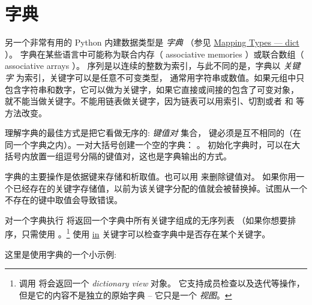 \documentclass[a4paper,10pt,english]{sphinxmanual}
\begin{document}
\section{字典}
\label{datastructures:tut-dictionaries}\label{datastructures:id10}
另一个非常有用的 Python 内建数据类型是 \emph{字典} （参见 \href{https://docs.python.org/3/library/stdtypes.html\#typesmapping}{Mapping Types — dict} ）。
字典在某些语言中可能称为联合内存（ associative memories ）或联合数组（ associative arrays ）。
序列是以连续的整数为索引，与此不同的是，字典以 \emph{关键字} 为索引，关键字可以是任意不可变类型，
通常用字符串或数值。如果元组中只包含字符串和数字，它可以做为关键字，如果它直接或间接的包含了可变对象，
就不能当做关键字。不能用链表做关键字，因为链表可以用索引、切割或者  和  等方法改变。

理解字典的最佳方式是把它看做无序的: \emph{键值对} 集合，
键必须是互不相同的（在同一个字典之内）。一对大括号创建一个空的字典： \code{\{\}} 。
初始化字典时，可以在大括号内放置一组逗号分隔的键值对，这也是字典输出的方式。

字典的主要操作是依据键来存储和析取值。也可以用  来删除键值对。
如果你用一个已经存在的关键字存储值，以前为该关键字分配的值就会被替换掉。试图从一个不存在的键中取值会导致错误。

对一个字典执行  将返回一个字典中所有关键字组成的无序列表
（如果你想要排序，只需使用 。\footnote{
调用  将会返回一个 \emph{dictionary view} 对象。
它支持成员检查以及迭代等操作，但是它的内容不是独立的原始字典 -- 它只是一个 \emph{视图}。
} 使用 \href{https://docs.python.org/3/reference/expressions.html\#in}{in} 关键字可以检查字典中是否存在某个关键字。

这里是使用字典的一个小示例:
\end{document}
